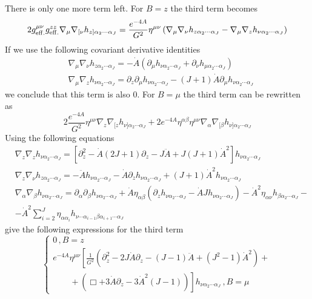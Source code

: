 \documentclass[a4paper,12pt]{article}
\begin{document}
There is only one more term left. For $B = z$ the third term becomes
\begin{equation}
2 g^{\mu \nu}_{\rm{eff.}} g^{zz}_{\rm{eff.}} \nabla_\mu \nabla_{[\nu}h_{z] \alpha_2 \cdots \alpha_J} = \frac{e^{-4A}}{G^2} \eta^{\mu \nu} \left( \nabla_\mu \nabla_\nu h_{z \alpha_2 \cdots \alpha_J} -  \nabla_\mu \nabla_z h_{\nu \alpha_2 \cdots \alpha_J}  \right)
\end{equation}
If we use the following covariant derivative identities
\begin{align}
&\nabla_\mu \nabla_\nu h_{z \alpha_2 \cdots \alpha_J} = -\dot{A} \left( \partial_\mu h_{\nu \alpha_2 \cdots \alpha_J} + \partial_\nu h_{\mu \alpha_2 \cdots \alpha_J} \right) \\
&\nabla_\mu \nabla_z h_{\nu \alpha_2 \cdots \alpha_J} = \partial_z \partial_\mu h_{\nu \alpha_2 \cdots \alpha_J} - \left(J+1\right) \dot{A} \partial_\mu h_{\nu \alpha_2 \cdots \alpha_J}
\end{align}
we conclude that this term is also 0. For $B = \mu$ the third term can be rewritten as
\begin{equation}
2 \frac{e^{-4A}}{G^2} \eta^{\mu \nu} \nabla_{z} \nabla_{[z} h_{\nu] \alpha_2 \cdots \alpha_J} + 2 e^{-4A} \eta^{\alpha \beta} \eta^{\mu \nu} \nabla_{\alpha} \nabla_{[\beta} h_{\nu] \alpha_2 \cdots \alpha_J}
\end{equation}
Using the following equations
\begin{align*}
&\nabla_z \nabla_z h_{\nu \alpha_2 \cdots \alpha_J} = \left[ \partial_z^2 - \dot{A} \left(2 J+1\right) \partial_z - J \ddot{A} + J \left(J+1\right) {\dot{A}}^2 \right] h_{\nu \alpha_2 \cdots \alpha_J} \\
&\nabla_z \nabla_\nu h_{z \alpha_2 \cdots \alpha_J} = - \ddot{A} h_{\nu \alpha_2 \cdots \alpha_J} - \dot{A} \partial_z h_{\nu \alpha_2 \cdots \alpha_J} + \left(J+1\right){\dot{A}}^2 h_{\nu \alpha_2 \cdots \alpha_J} \\
& \nabla_\alpha \nabla_\beta h_{\nu \alpha_2 \cdots \alpha_J} = \partial_\alpha \partial_\beta h_{\nu \alpha_2 \cdots \alpha_J} + \dot{A} \eta_{\alpha \beta} \left( \partial_z h_{\nu \alpha_2 \cdots \alpha_J} - \dot{A} J h_{\nu \alpha_2 \cdots \alpha_J}\right) - {\dot{A}}^2 \eta_{\alpha \nu} h_{\beta \alpha_2 \cdots \alpha_J} -  \\
&- {\dot{A}}^2 \sum_{i=2}^J \eta_{\alpha \alpha_i} h_{\nu \cdots \alpha_{i-1} \beta \alpha_{i+1} \cdots \alpha_J}
\end{align*}
give the following expressions for the third term
\begin{equation}
\begin{cases}
0 \, ,B = z \\
e^{-4A} \eta^{\mu \nu} \left[\frac{1}{G^2}\left(\partial_z^2 - 2 J \dot{A} \partial_z - \left(J-1\right) \ddot{A} + \left(J^2-1\right) {\dot{A}}^2 \right)+ \right. \\
\left. \qquad + \left( \Box + 3\dot{A} \partial_z - 3 {\dot{A}}^2 \left(J-1\right) \right)  \right]h_{\nu \alpha_2 \cdots \alpha_J} \, , B = \mu
\end{cases}
\end{equation}
\end{document}
